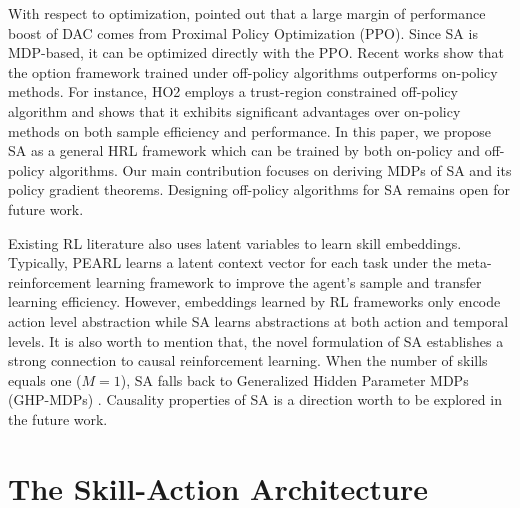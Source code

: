 With respect to optimization,  pointed out
that a large margin of performance boost of DAC comes from
Proximal Policy Optimization \cite{schulman2017proximal} (PPO).
Since SA is MDP-based, it can be optimized directly with the PPO.
Recent works show that the option framework trained under
off-policy \cite{haarnoja2018soft} algorithms outperforms
on-policy methods. For instance, HO2 \cite{wulfmeier2020data}
employs a trust-region constrained off-policy algorithm and shows
that it exhibits significant advantages over on-policy methods on
both sample efficiency and performance. In this paper, we propose
SA as a general HRL framework which can be trained by both
on-policy and off-policy algorithms. Our main contribution
focuses on deriving MDPs of SA and its policy gradient theorems.
Designing off-policy algorithms for SA remains open for future
work.

Existing RL literature
\cite{hausman2018learning,li2017infogail,tirumala2019exploiting}
also uses latent variables to learn skill embeddings. Typically,
PEARL \cite{rakelly2019efficient} learns a latent context vector
for each task under the meta-reinforcement learning framework to
improve the agent's sample and transfer learning efficiency.
However, embeddings learned by RL frameworks only encode action
level abstraction while SA learns abstractions at both action and
temporal levels. It is also worth to mention that, the novel
formulation of SA establishes a strong connection to causal
reinforcement learning. When the number of skills equals one
($M=1$), SA falls back to Generalized Hidden Parameter MDPs
(GHP-MDPs) \cite{kolobov2012discovering,perez2020generalized}.
Causality properties of SA is a direction worth to be explored in
the future work.


\section{The Skill-Action Architecture}
\label{sec:sa}

